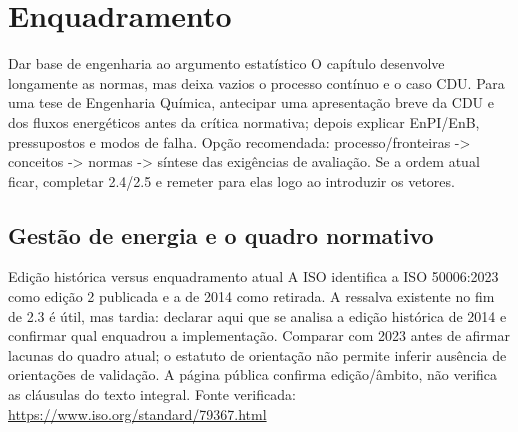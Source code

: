 
\chapter{Enquadramento}
\label{cha:enquadramento}
{Dar base de engenharia ao argumento estatístico}
{O capítulo desenvolve longamente as normas, mas deixa vazios o processo
contínuo e o caso CDU. Para uma tese de Engenharia Química, antecipar
uma apresentação breve da CDU e dos fluxos energéticos antes da crítica
normativa; depois explicar EnPI/EnB, pressupostos e modos de falha.
Opção recomendada: processo/fronteiras -\textgreater{} conceitos -\textgreater{} normas -\textgreater{}
síntese das exigências de avaliação. Se a ordem atual ficar, completar
2.4/2.5 e remeter para elas logo ao introduzir os vetores.}%

\section{Gestão de energia e o quadro normativo}
\label{sec:normas}
{Edição histórica versus enquadramento atual}
{A ISO identifica a ISO 50006:2023 como edição 2 publicada e a de 2014
como retirada. A ressalva existente no fim de 2.3 é útil, mas tardia:
declarar aqui que se analisa a edição histórica de 2014 e confirmar qual
enquadrou a implementação. Comparar com 2023 antes de afirmar lacunas do
quadro atual; o estatuto de orientação não permite inferir ausência de
orientações de validação. A página pública confirma edição/âmbito,
não verifica as cláusulas do texto integral.
Fonte verificada: \url{https://www.iso.org/standard/79367.html}}%

